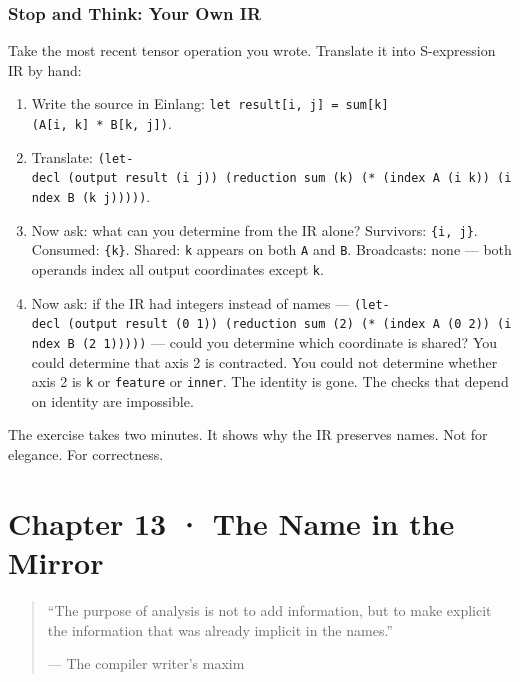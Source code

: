\documentclass[11pt,titlepage]{article}
\providecommand{\tightlist}{%
  \setlength{\itemsep}{0pt}\setlength{\parskip}{0pt}}
\begin{document}
\hypertarget{stop-and-think-your-own-ir}{%
\subsubsection{Stop and Think: Your Own
IR}\label{stop-and-think-your-own-ir}}

Take the most recent tensor operation you wrote. Translate it into
S-expression IR by hand:

\begin{enumerate}
\def\labelenumi{\arabic{enumi}.}
\tightlist
\item
  Write the source in Einlang:
  \texttt{let\ result{[}i,\ j{]}\ =\ sum{[}k{]}(A{[}i,\ k{]}\ *\ B{[}k,\ j{]})}.
\item
  Translate:
  \texttt{(let-decl\ (output\ result\ (i\ j))\ (reduction\ sum\ (k)\ (*\ (index\ A\ (i\ k))\ (index\ B\ (k\ j)))))}.
\item
  Now ask: what can you determine from the IR alone? Survivors:
  \texttt{\{i,\ j\}}. Consumed: \texttt{\{k\}}. Shared: \texttt{k}
  appears on both \texttt{A} and \texttt{B}. Broadcasts: none --- both
  operands index all output coordinates except \texttt{k}.
\item
  Now ask: if the IR had integers instead of names ---
  \texttt{(let-decl\ (output\ result\ (0\ 1))\ (reduction\ sum\ (2)\ (*\ (index\ A\ (0\ 2))\ (index\ B\ (2\ 1)))))}
  --- could you determine which coordinate is shared? You could
  determine that axis 2 is contracted. You could not determine whether
  axis 2 is \texttt{k} or \texttt{feature} or \texttt{inner}. The
  identity is gone. The checks that depend on identity are impossible.
\end{enumerate}

The exercise takes two minutes. It shows why the IR preserves names. Not
for elegance. For correctness.

\newpage

\hypertarget{chapter-13-the-name-in-the-mirror}{%
\section{Chapter 13 · The Name in the
Mirror}\label{chapter-13-the-name-in-the-mirror}}

\begin{quote}
``The purpose of analysis is not to add information, but to make
explicit the information that was already implicit in the names.''

--- The compiler writer's maxim
\end{quote}
\end{document}
